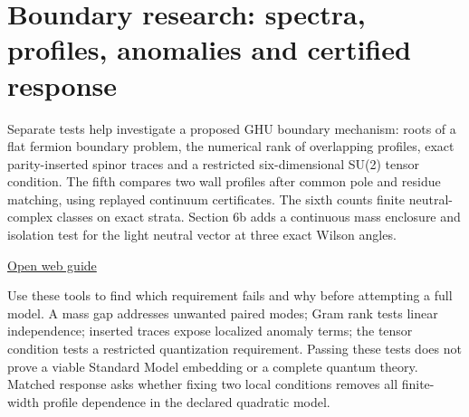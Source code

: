 \documentclass[11pt,a4paper]{article}
\begin{document}
\section{Boundary research: spectra, profiles, anomalies and certified response}
Separate tests help investigate a proposed GHU boundary mechanism: roots of a flat fermion boundary problem, the numerical rank of overlapping profiles, exact parity-inserted spinor traces and a restricted six-dimensional SU(2) tensor condition. The fifth compares two wall profiles after common pole and residue matching, using replayed continuum certificates. The sixth counts finite neutral-complex classes on exact strata. Section 6b adds a continuous mass enclosure and isolation test for the light neutral vector at three exact Wilson angles.

\href{https://karlesmarin.github.io/ghu-explorer/guide/boundaryresearch/index.html}{Open web guide}

Use these tools to find which requirement fails and why before attempting a full model. A mass gap addresses unwanted paired modes; Gram rank tests linear independence; inserted traces expose localized anomaly terms; the tensor condition tests a restricted quantization requirement. Passing these tests does not prove a viable Standard Model embedding or a complete quantum theory. Matched response asks whether fixing two local conditions removes all finite-width profile dependence in the declared quadratic model.
\end{document}
